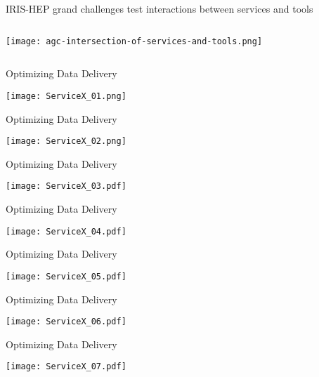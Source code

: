 \begin{frame}{IRIS-HEP grand challenges test interactions between services and tools}
\vspace{0.35 cm}
\begin{columns}
\texttt{[image: agc-intersection-of-services-and-tools.png]}
\end{columns}
\end{frame}

\begin{frame}{Optimizing Data Delivery}
\begin{center}
\texttt{[image: ServiceX\_01.png]}
\end{center}
\end{frame}

\begin{frame}{Optimizing Data Delivery}
\begin{center}
\texttt{[image: ServiceX\_02.png]}
\end{center}
\end{frame}

\begin{frame}{Optimizing Data Delivery}
\vspace{0.1cm}
\begin{center}
\texttt{[image: ServiceX\_03.pdf]}
\end{center}
\end{frame}

\begin{frame}{Optimizing Data Delivery}
\vspace{0.1cm}
\begin{center}
\texttt{[image: ServiceX\_04.pdf]}
\end{center}
\end{frame}

\begin{frame}{Optimizing Data Delivery}
\vspace{0.1cm}
\begin{center}
\texttt{[image: ServiceX\_05.pdf]}
\end{center}
\end{frame}

\begin{frame}{Optimizing Data Delivery}
\vspace{0.1cm}
\begin{center}
\texttt{[image: ServiceX\_06.pdf]}
\end{center}
\end{frame}

\begin{frame}{Optimizing Data Delivery}
\vspace{0.1cm}
\begin{center}
\texttt{[image: ServiceX\_07.pdf]}
\end{center}
\end{frame}
